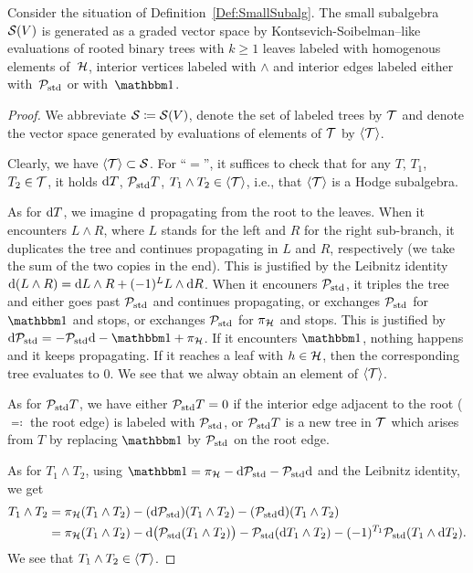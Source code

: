 \documentclass[\MainFolder/Text.tex]{subfiles}
\begin{document}
\begin{Proposition}\label{Prop:SmallDescription}
Consider the situation of Definition~\ref{Def:SmallSubalg}. The small subalgebra $\mathcal{S}(V)$ is generated as a graded vector space by Kontsevich-Soibelman--like evaluations of rooted binary trees with $k\ge 1$ leaves labeled with homogenous elements of~$\mathcal{H}$, interior vertices labeled with $\wedge$ and interior edges labeled either with~$\mathcal{P}_{\mathrm{std}}$ or with~$\Id$.
\end{Proposition}
\begin{proof}
We abbreviate $\mathcal{S} \coloneqq \mathcal{S}(V)$, denote the set of labeled trees by $\mathcal{T}$ and denote the vector space generated by evaluations of elements of $\mathcal{T}$ by $\langle \mathcal{T}\rangle$.

Clearly, we have $\langle \mathcal{T}\rangle \subset \mathcal{S}$. For ``$=$'', it suffices to check that for any $T$, $T_1$, $T_2\in\mathcal{T}$, it holds $\mathrm{d} T$, $\mathcal{P}_{\mathrm{std}} T$, $T_1 \wedge T_2 \in \langle\mathcal{T}\rangle$, i.e., that $\langle \mathcal{T}\rangle$ is a Hodge subalgebra.

As for $\mathrm{d} T$, we imagine $\mathrm{d}$ propagating from the root to the leaves. When it encounters $L\wedge R$, where $L$ stands for the left and $R$ for the right sub-branch, it duplicates the tree and continues propagating in $L$ and $R$, respectively (we take the sum of the two copies in the end). This is justified by the Leibnitz identity $\mathrm{d}(L\wedge R) = \mathrm{d} L\wedge R + (-1)^L L \wedge \mathrm{d} R$. When it encouners $\mathcal{P}_{\mathrm{std}}$, it triples the tree and either goes past $\mathcal{P}_{\mathrm{std}}$ and continues propagating, or exchanges $\mathcal{P}_{\mathrm{std}}$ for $\Id$ and stops, or exchanges $\mathcal{P}_{\mathrm{std}}$ for $\pi_{\mathcal{H}}$ and stops. This is justified by $\Dd \HtpStd = -\HtpStd \Dd - \Id + \pi_\Harm$. If it encounters $\Id$, nothing happens and it keeps propagating. If it reaches a leaf with $h\in \mathcal{H}$, then the corresponding tree evaluates to $0$. We see that we alway obtain an element of $\langle\mathcal{T}\rangle$.

As for $\mathcal{P}_{\mathrm{std}} T$, we have either $\mathcal{P}_{\mathrm{std}} T = 0$ if the interior edge adjacent to the root ($\eqqcolon$ the root edge) is labeled with $\mathcal{P}_{\mathrm{std}}$, or $\mathcal{P}_{\mathrm{std}} T$ is a new tree in $\mathcal{T}$ which arises from $T$ by replacing $\Id$ by $\mathcal{P}_{\mathrm{std}}$ on the root edge.

As for $T_1 \wedge T_2$, using $\Id = \pi_\Harm - \Dd \HtpStd - \HtpStd \Dd$ and the Leibnitz identity, we get
\begin{align*}
T_1 \wedge T_2 &= \pi_{\mathcal{H}}(T_1 \wedge T_2) - (\mathrm{d} \mathcal{P}_{\mathrm{std}})(T_1 \wedge T_2) - (\mathcal{P}_{\mathrm{std}} \mathrm{d})(T_1 \wedge T_2) \\
&= \pi_{\mathcal{H}}(T_1 \wedge T_2) - \mathrm{d}\bigl(\mathcal{P}_{\mathrm{std}}(T_1 \wedge T_2)\bigr) - \mathcal{P}_{\mathrm{std}}(\mathrm{d} T_1 \wedge T_2)
- (-1)^{T_1} \mathcal{P}_{\mathrm{std}}(T_1 \wedge \mathrm{d} T_2).
\end{align*}
We see that $T_1\wedge T_2 \in \langle \mathcal{T}\rangle$.
\end{proof}
\end{document}

